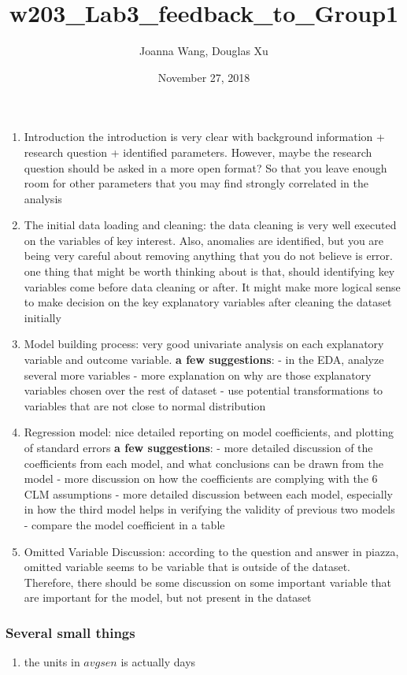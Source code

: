 \documentclass[]{article}
\title{w203\_Lab3\_feedback\_to\_Group1}
\author{Joanna Wang, Douglas Xu}
\date{November 27, 2018}
\providecommand{\tightlist}{%
  \setlength{\itemsep}{0pt}\setlength{\parskip}{0pt}}
\begin{document}
\maketitle

\begin{enumerate}
\def\labelenumi{\arabic{enumi}.}
\item
  Introduction \tab the introduction is very clear with background
  information + research question + identified parameters. However,
  maybe the research question should be asked in a more open format? So
  that you leave enough room for other parameters that you may find
  strongly correlated in the analysis
\item
  The initial data loading and cleaning: \tab the data cleaning is very
  well executed on the variables of key interest. Also, anomalies are
  identified, but you are being very careful about removing anything
  that you do not believe is error. \tab one thing that might be worth
  thinking about is that, should identifying key variables come before
  data cleaning or after. It might make more logical sense to make
  decision on the key explanatory variables after cleaning the dataset
  initially
\item
  Model building process: \tab very good univariate analysis on each
  explanatory variable and outcome variable. \tab \textbf{a few
  suggestions}: \tab - in the EDA, analyze several more variables \tab -
  more explanation on why are those explanatory variables chosen over
  the rest of dataset \tab - use potential transformations to variables
  that are not close to normal distribution
\item
  Regression model: \tab nice detailed reporting on model coefficients,
  and plotting of standard errors \tab \textbf{a few suggestions}:
  \tab - more detailed discussion of the coefficients from each model,
  and what conclusions can be drawn from the model \tab - more
  discussion on how the coefficients are complying with the 6 CLM
  assumptions \tab - more detailed discussion between each model,
  especially in how the third model helps in verifying the validity of
  previous two models \tab - compare the model coefficient in a table
\item
  Omitted Variable Discussion: \tab according to the question and answer
  in piazza, omitted variable seems to be variable that is outside of
  the dataset. Therefore, there should be some discussion on some
  important variable that are important for the model, but not present
  in the dataset
\end{enumerate}

\subsubsection{Several small things}\label{several-small-things}

\begin{enumerate}
\def\labelenumi{\arabic{enumi}.}
\tightlist
\item
  the units in \(avgsen\) is actually days
\end{enumerate}
\end{document}
